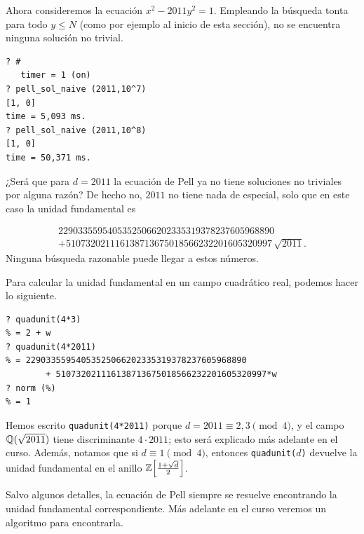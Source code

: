 Ahora consideremos la ecuación $x^2 - 2011 y^2 = 1$. Empleando la búsqueda tonta
para todo $y \le N$ (como por ejemplo al inicio de esta sección), no se
encuentra ninguna solución no trivial.

\begin{shaded}
\begin{verbatim}
? #
   timer = 1 (on)
? pell_sol_naive (2011,10^7)
[1, 0]
time = 5,093 ms.
? pell_sol_naive (2011,10^8)
[1, 0]
time = 50,371 ms.
\end{verbatim}
\end{shaded}

¿Será que para $d = 2011$ la ecuación de Pell ya no tiene soluciones no
triviales por alguna razón? De hecho no, $2011$ no tiene nada de especial,
solo que en este caso la unidad fundamental es

\begin{multline*}
  22903355954053525066202335319378237605968890\\
  + 510732021116138713675018566232201605320997\,\sqrt{2011}.
\end{multline*}
Ninguna búsqueda razonable puede llegar a estos números.

\begin{shaded}
  Para calcular la unidad fundamental en un campo cuadrático real, podemos hacer
  lo siguiente.
\begin{verbatim}
? quadunit(4*3)
% = 2 + w
? quadunit(4*2011)
% = 22903355954053525066202335319378237605968890
        + 510732021116138713675018566232201605320997*w
? norm (%)
% = 1
\end{verbatim}
  Hemos escrito \texttt{quadunit(4*2011)} porque $d = 2011 \equiv 2,3 \pmod{4}$,
  y el campo $\mathbb{Q} (\sqrt{2011})$ tiene discriminante $4\cdot 2011$; esto será
  explicado más adelante en el curso. Además, notamos que si
  $d \equiv 1 \pmod{4}$, entonces \texttt{quadunit($d$)} devuelve la unidad
  fundamental en el anillo $\mathbb{Z} \Bigl[\frac{1+\sqrt{d}}{2}\Bigr]$.
\end{shaded}

Salvo algunos detalles, la ecuación de Pell siempre se resuelve encontrando
la unidad fundamental correspondiente. Más adelante en el curso veremos un
algoritmo para encontrarla.

